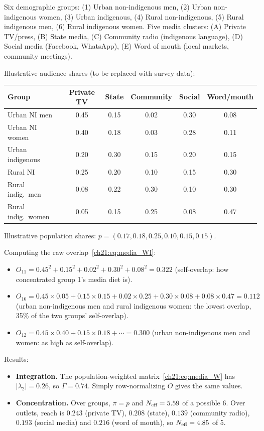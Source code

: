 \documentclass[../structural_economics_book.tex]{subfiles}
\begin{document}
\begin{example}\label{ch21:ex:bolivia_media}
Six demographic groups: (1) Urban non-indigenous men, (2) Urban non-indigenous women, (3) Urban indigenous, (4) Rural non-indigenous, (5) Rural indigenous men, (6) Rural indigenous women. Five media clusters: (A) Private TV/press, (B) State media, (C) Community radio (indigenous language), (D) Social media (Facebook, WhatsApp), (E) Word of mouth (local markets, community meetings).

Illustrative audience shares (to be replaced with survey data):
\begin{center}
\small
\begin{tabular}{l|ccccc}
\toprule
Group & Private TV & State & Community & Social & Word/mouth \\
\midrule
Urban NI men & 0.45 & 0.15 & 0.02 & 0.30 & 0.08 \\
Urban NI women & 0.40 & 0.18 & 0.03 & 0.28 & 0.11 \\
Urban indigenous & 0.20 & 0.30 & 0.15 & 0.20 & 0.15 \\
Rural NI & 0.25 & 0.20 & 0.10 & 0.15 & 0.30 \\
Rural indig.\ men & 0.08 & 0.22 & 0.30 & 0.10 & 0.30 \\
Rural indig.\ women & 0.05 & 0.15 & 0.25 & 0.08 & 0.47 \\
\bottomrule
\end{tabular}
\end{center}
Illustrative population shares: $p = (0.17, 0.18, 0.25, 0.10, 0.15, 0.15)$.

Computing the raw overlap~\eqref{ch21:eq:media_WI}:
\begin{itemize}
\item $O_{11} = 0.45^2 + 0.15^2 + 0.02^2 + 0.30^2 + 0.08^2 = 0.322$ (self-overlap: how concentrated group 1's media diet is).
\item $O_{16} = 0.45 \times 0.05 + 0.15 \times 0.15 + 0.02 \times 0.25 + 0.30 \times 0.08 + 0.08 \times 0.47 = 0.112$ (urban non-indigenous men and rural indigenous women: the lowest overlap, 35\% of the two groups' self-overlap).
\item $O_{12} = 0.45 \times 0.40 + 0.15 \times 0.18 + \cdots = 0.300$ (urban non-indigenous men and women: as high as self-overlap).
\end{itemize}

Results:
\begin{itemize}
\item \textbf{Integration.} The population-weighted matrix~\eqref{ch21:eq:media_W} has $|\lambda_2| = 0.26$, so $\Gamma = 0.74$. Simply row-normalizing $O$ gives the same values.
\item \textbf{Concentration.} Over groups, $\pi = p$ and $N_{\text{eff}} = 5.59$ of a possible 6. Over outlets, reach is $0.243$ (private TV), $0.208$ (state), $0.139$ (community radio), $0.193$ (social media) and $0.216$ (word of mouth), so $N_{\text{eff}} = 4.85$ of 5.
\end{itemize}


\end{example}
\end{document}
